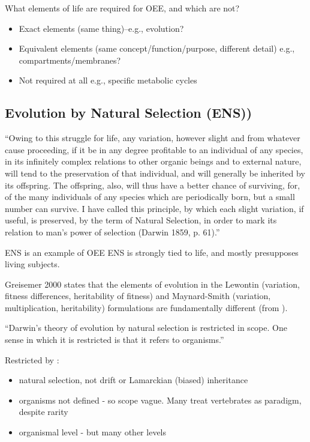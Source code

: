 What elements of life are required for OEE, and which are not?

\begin{itemize}
	\item
	      Exact elements (same thing)--e.g., evolution?
	\item
	      Equivalent elements (same concept/function/purpose, different detail) e.g., compartments/membranes?
	\item
	      Not required at all e.g., specific metabolic cycles
\end{itemize}
\subsection{Evolution by Natural Selection (ENS))}\label{ens-evolution-by-natural-selection}


		``Owing to this struggle for life, any variation, however slight and
		from whatever cause proceeding, if it be in any degree profitable to
		an individual of any species, in its infinitely complex relations to
		other organic beings and to external nature, will tend to the
		preservation of that individual, and will generally be inherited by
		its offspring. The offspring, also, will thus have a better chance
		of surviving, for, of the many individuals of any species which are
		periodically born, but a small number can survive. I have called
		this principle, by which each slight variation, if useful, is
		preserved, by the term of Natural Selection, in order to mark its
		relation to man's power of selection (Darwin 1859, p. 61).'' \autocite{Griesemer2005}
		
ENS is an example of OEE
ENS is strongly tied to life, and mostly presupposes living subjects.

	Greisemer 2000 states that the elements of evolution in the Lewontin (variation, fitness differences, heritability of fitness) and Maynard-Smith (variation, multiplication, heritability) formulations are fundamentally different (from \autocite{Vasas2015}).


``Darwin's theory of evolution by natural selection is restricted in scope. One sense in which it is restricted is that it refers to organisms.'' \autocite{Griesemer2005}

Restricted by \autocite{Griesemer2005}:
\begin{itemize}
	\item natural selection, not drift or Lamarckian (biased) inheritance
	\item organisms not defined - so scope vague. Many treat vertebrates as paradigm, despite rarity
	\item organismal level - but many other levels
\end{itemize}


